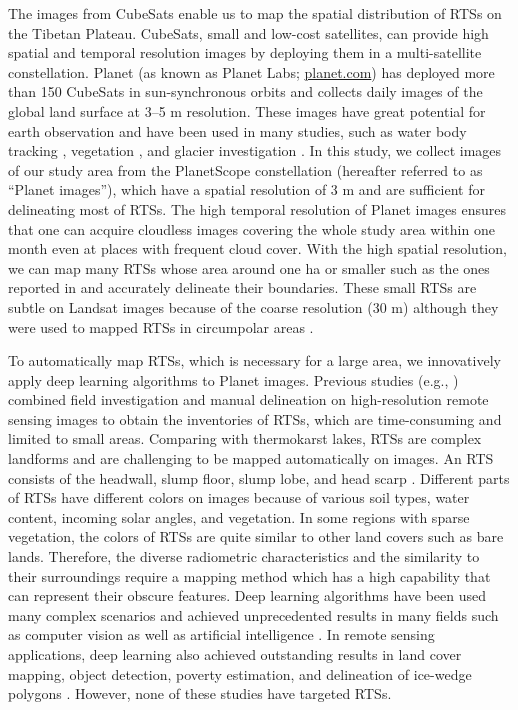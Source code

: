 \documentclass[preprint,12pt,authoryear]{elsarticle}
\begin{document}
The images from CubeSats enable us to map the spatial distribution of RTSs on the Tibetan Plateau. CubeSats, small and low-cost satellites, can provide high spatial and temporal resolution images by deploying them in a multi-satellite constellation. Planet (as known as Planet Labs; \url{planet.com}) has deployed more than 150 CubeSats in sun-synchronous orbits and collects daily images of the global land surface at 3--5 m resolution. These images have great potential for earth observation and have been used in many studies, such as water body tracking \citep{cooley2017tracking, cooley2019arctic, aragon2018cubesats, miles2018glacial}, vegetation \citep{houborg2016high, houborg2018daily}, and glacier investigation \citep{altena2017glacier}. In this study, we collect images of our study area from the PlanetScope constellation (hereafter referred to as “Planet images”), which have a spatial resolution of 3 m and are sufficient for delineating most of RTSs. The high temporal resolution of Planet images ensures that one can acquire cloudless images covering the whole study area within one month even at places with frequent cloud cover. With the high spatial resolution, we can map many RTSs whose area around one ha or smaller such as the ones reported in \cite{niu2012development,niu2016thaw} and accurately delineate their boundaries. These small RTSs are subtle on Landsat images because of the coarse resolution (30 m) although they were used to mapped RTSs in circumpolar areas \citep{lacelle_distribution_2015, brooker2014mapping, nitze2018remote}. %

To automatically map RTSs, which is necessary for a large area, we innovatively apply deep learning algorithms to Planet images. Previous studies (e.g., \citealp{ramage_terrain_2017, lantuit_fifty_2008, niu2014thaw}) combined field investigation and manual delineation on high-resolution remote sensing images to obtain the inventories of RTSs, which are time-consuming and limited to small areas. Comparing with thermokarst lakes, RTSs are complex landforms and are challenging to be mapped automatically on images. An RTS consists of the headwall, slump floor, slump lobe, and head scarp \citep{lantuit_fifty_2008}. Different parts of RTSs have different colors on images because of various soil types, water content, incoming solar angles, and vegetation. In some regions with sparse vegetation, the colors of RTSs are quite similar to other land covers such as bare lands. Therefore, the diverse radiometric characteristics and the similarity to their surroundings require a mapping method which has a high capability that can represent their obscure features. Deep learning algorithms have been used many complex scenarios and achieved unprecedented results in many fields such as computer vision as well as artificial intelligence \citep{krizhevsky_imagenet_2012, lecun_deep_2015, silver_mastering_2017}. In remote sensing applications, deep learning also achieved outstanding results in land cover mapping, object detection, poverty estimation, and delineation of ice-wedge polygons \citep{jean_combining_2016, guo_geospatial_2018, zhang2018deep}. However, none of these studies have targeted RTSs. 
\end{document}
